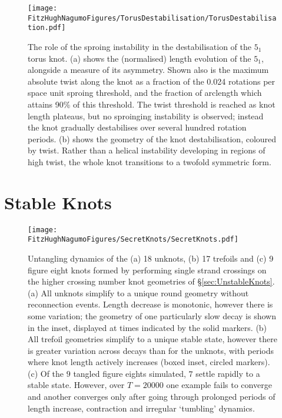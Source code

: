 \begin{figure}[htbp]
\centering
    \texttt{[image: \\FitzHughNagumoFigures/TorusDestabilisation/TorusDestabilisation.pdf]}
    \caption{ The role of the sproing instability in the destabilisation of the $5_1$ torus knot. (a) shows the (normalised) length evolution of the $5_1$, alongside a measure of its asymmetry. Shown also is the maximum absolute twist along the knot as a fraction of the 0.024 rotations per space unit sproing threshold, and the fraction of arclength which attains 90\% of this threshold. The twist threshold is reached as knot length plateaus, but no sproinging instability is observed; instead the knot gradually destabilises over several hundred rotation periods. (b) shows the geometry of the knot destabilisation, coloured by twist. Rather than a helical instability developing in regions of high twist, the whole knot transitions to a twofold symmetric form.}
\label{fig:TorusDestabilisation}
\end{figure}

\section{\label{sec:StableKnots}Stable Knots}
\begin{figure}[htbp]
    \texttt{[image: \\FitzHughNagumoFigures/SecretKnots/SecretKnots.pdf]}
    \caption{ Untangling dynamics of the (a) 18 unknots, (b) 17 trefoils and (c) 9 figure eight knots formed by performing single strand crossings on the higher crossing number knot geometries of \S \ref{sec:UnstableKnots}. (a) All unknots simplify to a unique round geometry without reconnection events. Length decrease is monotonic, however there is some variation; the geometry of one particularly slow decay is shown in the inset, displayed at times indicated by the solid markers. (b) All trefoil geometries simplify to a unique stable state, however there is greater variation across decays than for the unknots, with periods where knot length actively increases (boxed inset, circled markers). (c) Of the $9$ tangled figure eights simulated, $7$ settle rapidly to a stable state. However, over $T=20000$ one example fails to converge and another converges only after going through prolonged periods of length increase, contraction and irregular `tumbling' dynamics.} 
\label{fig:SecretFourOneLength}
\end{figure}

